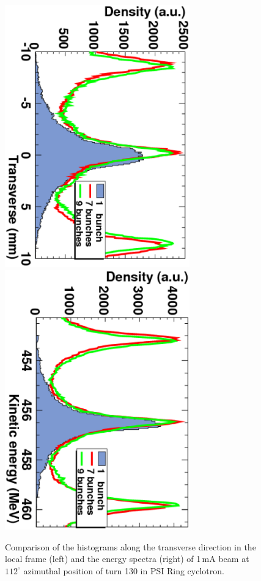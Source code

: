 \documentclass{JAC2003}
\begin{document}
\begin{figure}
  \centering
  \includegraphics[angle=90,width=80mm]{figures/C9B7BSB-R-1mA-130.ps}
  \includegraphics[angle=90,width=80mm]{figures/C9B7BSB-Energy-1mA-130.ps}
  \caption{Comparison of the histograms along the transverse direction in the local frame (left) and the energy spectra (right) of 1\,mA beam
    at $112^\circ$ azimuthal position of turn 130 in PSI Ring cyclotron.}
  \label{fig:NBcompare}
\end{figure}
\end{document}
